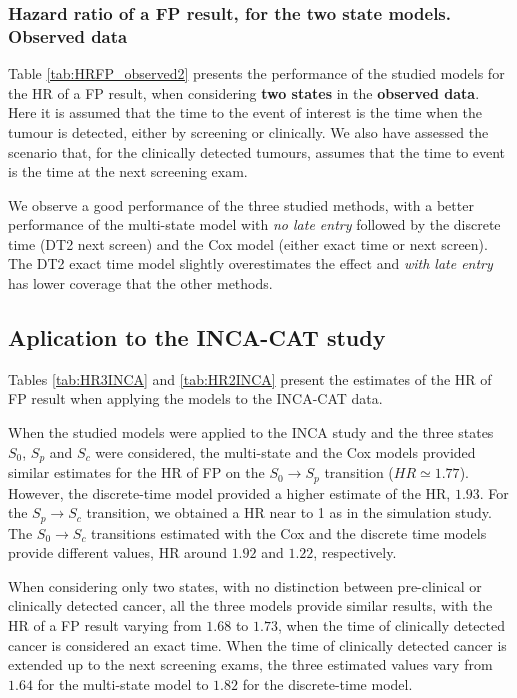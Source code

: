 \documentclass{bmcart}
\begin{document}
\subsubsection*{Hazard ratio of a FP result, for the two state models. Observed data}
Table \ref{tab:HRFP_observed2} presents the performance of the studied models for the HR of a FP
result, when considering \textbf{two states} in the \textbf{observed data}. Here it is assumed that
the time to the event of interest is the time when the tumour is detected, either by screening or
clinically. We also have assessed the scenario that, for the clinically detected tumours, assumes
that the time to event is the time at the next screening exam. 

We observe a good performance of the three studied methods, with a better performance of the
multi-state model with \textit{no late entry} followed by the discrete time (DT2 next screen) and
the Cox model (either exact time or next screen). The DT2 exact time model slightly overestimates
the effect and \textit{with late entry} has lower coverage that the other methods. 

\subsection*{Aplication to the INCA-CAT study}
Tables \ref{tab:HR3INCA} and \ref{tab:HR2INCA} present the estimates of the HR of FP
result when applying the models to the INCA-CAT data. 

When the studied models were applied to the INCA study and the three states $S_0$, $S_p$ and $S_c$
were considered, the multi-state and the Cox models provided similar estimates for the HR of FP on
the $S_0 \rightarrow S_p$ transition ($HR \simeq 1.77$).  However, the discrete-time model
provided a higher estimate of the HR, $1.93$. For the $S_p \rightarrow S_c$ transition, we obtained
a HR near to 1 as in the simulation study. The $S_0 \rightarrow S_c$ transitions estimated with the
Cox and the discrete time models provide different values, HR around $1.92$ and $1.22$,
respectively.

When considering only two states, with no distinction between pre-clinical or clinically detected
cancer, all the three models provide similar results, with the HR of a FP result varying from
$1.68$ to $1.73$, when the time of clinically detected cancer is considered an exact time. When the
time of clinically detected cancer is extended up to the next screening exams, the three estimated
values vary from $1.64$ for the multi-state model to $1.82$ for the discrete-time model.
\end{document}
